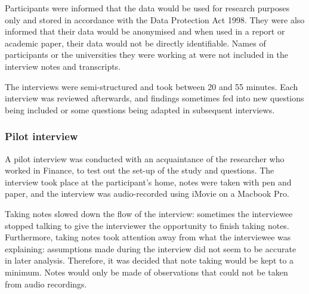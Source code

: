 Participants were informed that the data would be used for research purposes only and stored in accordance with the Data Protection Act 1998. They were also informed that their data would be anonymised and when used in a report or academic paper, their data would not be directly identifiable. Names of participants or the universities they were working at were not included in the interview notes and transcripts.

The interviews were semi-structured and took between 20 and 55 minutes. Each interview was reviewed afterwards, and findings sometimes fed into new questions being included or some questions being adapted in subsequent interviews.

\subsubsection{Pilot interview}
A pilot interview was conducted with an acquaintance of the researcher who worked in Finance, to test out the set-up of the study and questions. The interview took place at the participant's home, notes were taken with pen and paper, and the interview was audio-recorded using iMovie on a Macbook Pro. 

Taking notes slowed down the flow of the interview: sometimes the interviewee stopped talking to give the interviewer the opportunity to finish taking notes. Furthermore, taking notes took attention away from what the interviewee was explaining: assumptions made during the interview did not seem to be accurate in later analysis. Therefore, it was decided that note taking would be kept to a minimum. Notes would only be made of observations that could not be taken from audio recordings.


